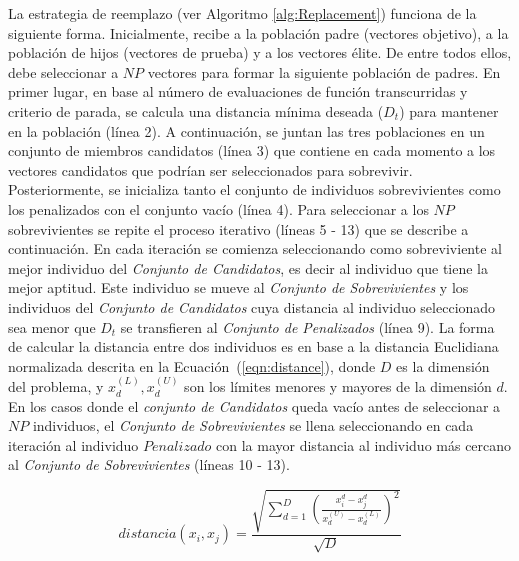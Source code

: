 La estrategia de reemplazo (ver Algoritmo \ref{alg:Replacement}) funciona de la siguiente forma.
%
Inicialmente, recibe a la población padre (vectores objetivo), a la población de hijos (vectores de prueba) y a los vectores élite.
%
De entre todos ellos, debe seleccionar a $NP$ vectores para formar la siguiente población de padres.
%
En primer lugar, en base al número de evaluaciones de función transcurridas y criterio de parada, se calcula una distancia mínima deseada ($D_t$) para mantener 
en la población (línea 2).
%
A continuación, se juntan las tres poblaciones en un conjunto de miembros candidatos (línea 3) que contiene en cada momento a los vectores candidatos 
que podrían ser seleccionados para sobrevivir.
%
Posteriormente, se inicializa tanto el conjunto de individuos sobrevivientes como los penalizados con el conjunto vacío (línea 4).
%
Para seleccionar a los $NP$ sobrevivientes se repite el proceso iterativo (líneas 5 - 13) que se describe a continuación.
%
En cada iteración se comienza seleccionando como sobreviviente al mejor individuo del \textit{Conjunto de Candidatos}, es decir al individuo que tiene la mejor aptitud.
%
Este individuo se mueve al \textit{Conjunto de Sobrevivientes} y los individuos del \textit{Conjunto de Candidatos} cuya distancia al individuo seleccionado sea menor 
que $D_t$ se transfieren al \textit{Conjunto de Penalizados} (línea 9).
%
La forma de calcular la distancia entre dos individuos es en base a la distancia Euclidiana normalizada descrita en la Ecuación~(\ref{eqn:distance}), 
donde $D$ es la dimensión del problema, y $x_d^{(L)}, x_d^{(U)}$ son los límites menores y mayores de la dimensión $d$.
%
En los casos donde el \textit{conjunto de Candidatos} queda vacío antes de seleccionar a $NP$ individuos, 
el \textit{Conjunto de Sobrevivientes} se llena seleccionando en cada iteración al individuo $Penalizado$ con la mayor distancia al individuo más cercano 
al \textit{Conjunto de Sobrevivientes} (líneas 10 - 13).

\begin{equation}\label{eqn:distance}
distancia ( x_{i}, x_j ) = \frac{\sqrt{ \sum_{d=1}^D \left ( \frac{x_{i}^d - x_j^d}{x_d^{(U)} - x_d^{(L)}} \right )^2  }} {\sqrt{D}}
\end{equation}


